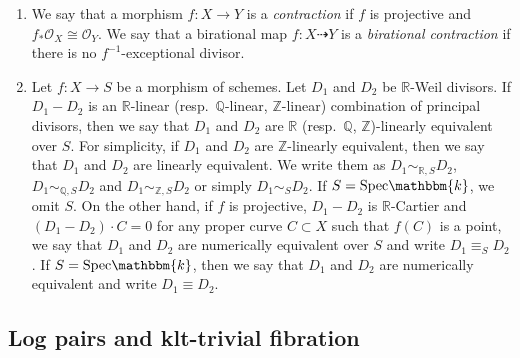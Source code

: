 \documentclass[12pt,twoside]{amsart}
\theoremstyle{definition}
\begin{document}
\begin{enumerate}
    Then, we will write the induced morphism $X\times_ST\to Y\times_{S}T$ from $f$ and $\varphi$ as $f_T\colon X_T\to Y_T$ and let $L_S$ denote the pullback of $L$ to $X_T$.
    If $s\in S$ is a point and $\varphi$ is $\mathrm{Spec}(\kappa(s))\to S$, then we write $f_T$ as $f_s\colon X_s\to Y_s$ and $L_T$ as $L_s$.
    If $\bar{s}$ is a geometric point of $S$ induced by $T=\mathrm{Spec}(\overline{\kappa(s)})$, then we will write $f_T$ as $f_{\bar{s}}\colon X_{\bar{s}}\to Y_{\bar{s}}$ and $L_T$ as $L_{\bar{s}}$.
    \item We say that a morphism $f\colon X\to Y$ is a {\it contraction} if $f$ is projective and $f_*\mathcal{O}_X\cong\mathcal{O}_Y$.
    We say that a birational map $f\colon X\dashrightarrow Y$ is a {\it birational contraction} if there is no $f^{-1}$-exceptional divisor.
    \item Let $f\colon X\to S$ be a morphism of schemes.
    Let $D_1$ and $D_2$ be $\mathbb{R}$-Weil divisors.
    If $D_1-D_2$ is an $\mathbb{R}$-linear (resp.~$\mathbb{Q}$-linear, $\mathbb{Z}$-linear) combination of principal divisors, then we say that $D_1$ and $D_2$ are $\mathbb{R}$ (resp.~$\mathbb{Q}$, $\mathbb{Z}$)-linearly equivalent over $S$.
For simplicity, if $D_1$ and $D_2$ are $\mathbb{Z}$-linearly equivalent, then we say that $D_1$ and $D_2$ are linearly equivalent.
We write them as $D_1\sim_{\mathbb{R},S}D_2$, $D_1\sim_{\mathbb{Q},S}D_2$ and $D_1\sim_{\mathbb{Z},S}D_2$ or simply $D_1\sim_{S}D_2$.
If $S=\mathrm{Spec}\mathbbm{k}$, we omit $S$.
On the other hand, if $f$ is projective, $D_1-D_2$ is $\mathbb{R}$-Cartier and $(D_1-D_2)\cdot C=0$ for any proper curve $C\subset X$ such that $f(C)$ is a point, we say that $D_1$ and $D_2$ are numerically equivalent over $S$ and write $D_1\equiv_S D_2$.
If $S=\mathrm{Spec}\mathbbm{k}$, then we say that $D_1$ and $D_2$ are numerically equivalent and write $D_1\equiv D_2$. 
\end{enumerate}




\subsection{Log pairs and klt-trivial fibration}
\end{document}
